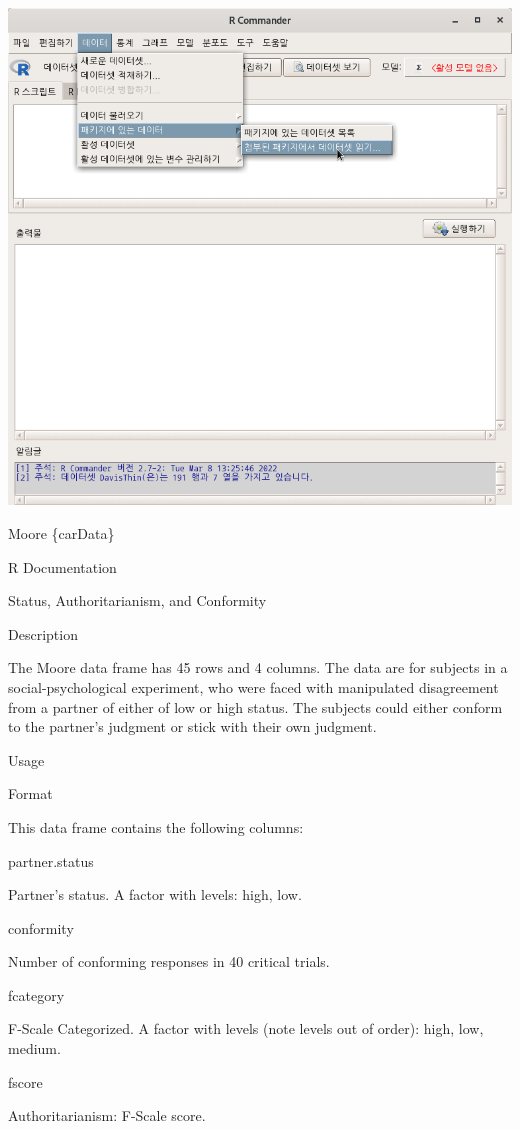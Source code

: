 \documentclass[
]{book}
\begin{document}
\includegraphics{fig/dataset-moore-01.png}

Moore \{carData\}

R Documentation

Status, Authoritarianism, and Conformity

Description

The Moore data frame has 45 rows and 4 columns.
The data are for subjects in a social-psychological experiment,
who were faced with manipulated disagreement from a partner of either
of low or high status. The subjects could either conform to the
partner's judgment or stick with their own judgment.

Usage

Format

This data frame contains the following columns:

partner.status

Partner's status. A factor with levels:
high,
low.

conformity

Number of conforming responses in 40 critical trials.

fcategory

F-Scale Categorized.
A factor with levels (note levels out of order):
high,
low,
medium.

fscore

Authoritarianism: F-Scale score.
\end{document}
